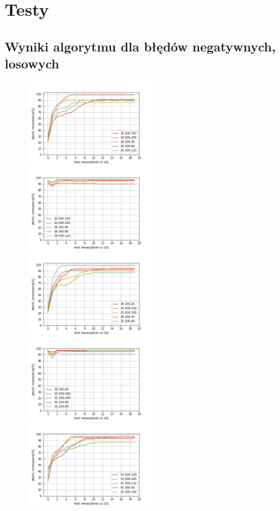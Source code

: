 \documentclass{article}
\begin{document}
\section{Testy}
\subsection{Wyniki algorytmu dla błędów negatywnych, losowych}
\begin{figure}[H]
\includegraphics[width=0.5\textwidth]{neg-los1.png}
\includegraphics[width=0.5\textwidth]{neg-los-greedy1.png}
\includegraphics[width=0.5\textwidth]{neg-los2.png}
\includegraphics[width=0.5\textwidth]{neg-los-greedy2.png}
\includegraphics[width=0.5\textwidth]{neg-los3.png}

\end{figure}
\end{document}
